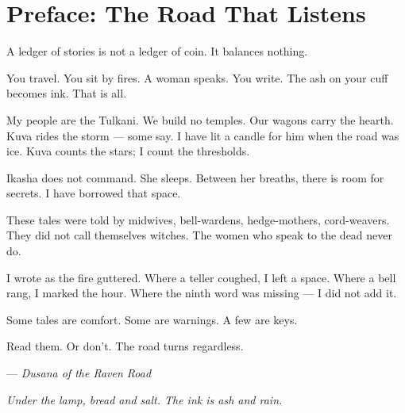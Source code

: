 \chapter*{Preface: The Road That Listens}

A ledger of stories is not a ledger of coin. It balances nothing.

\smallskip

You travel. You sit by fires. A woman speaks. You write. The ash on your cuff becomes ink. That is all.

\smallskip

My people are the Tulkani. We build no temples. Our wagons carry the hearth. Kuva rides the storm --- some say. I have lit a candle for him when the road was ice. Kuva counts the stars; I count the thresholds.

\smallskip

Ikasha does not command. She sleeps. Between her breaths, there is room for secrets. I have borrowed that space.

\smallskip

These tales were told by midwives, bell-wardens, hedge-mothers, cord-weavers. They did not call themselves witches. The women who speak to the dead never do.

\smallskip

I wrote as the fire guttered. Where a teller coughed, I left a space. Where a bell rang, I marked the hour. Where the ninth word was missing --- I did not add it.

\smallskip

Some tales are comfort. Some are warnings. A few are keys.

\smallskip

Read them. Or don't. The road turns regardless.

\smallskip

\noindent --- \textit{Dusana of the Raven Road}

\noindent \textit{Under the lamp, bread and salt. The ink is ash and rain.}
